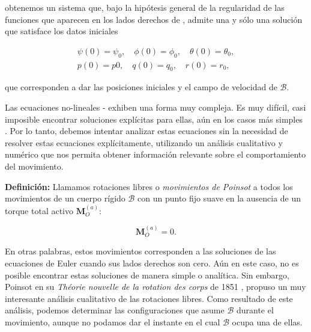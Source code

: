 \documentclass[a4paper,10pt]{article}
\numberwithin{equation}{section}
\newcommand{\definicion}{\textbf{Definición: }}
\begin{document}
obtenemos un sistema que, bajo la hipótesis general de la regularidad de las funciones 
que aparecen en los lados derechos de , admite 
una y sólo una solución que satisface los datos iniciales

\begin{align}
 \psi(0) = \psi_0, \quad \phi(0) = \phi_0, \quad \theta(0) = \theta_0, \\
 p(0) = p0, \quad q(0) = q_0, \quad r(0) = r_0, 
 \label{eq:poinsot13}
\end{align}

que corresponden a dar las posiciones iniciales y el campo de velocidad de $\mathcal{B}$.

\vspace{.3cm}

Las ecuaciones no-lineales - exhiben una forma muy compleja.
Es muy difícil, casi imposible encontrar soluciones explícitas para ellas, aún en los casos
más simples \cite{romano}. Por lo tanto, debemos intentar analizar estas ecuaciones sin 
la necesidad de resolver estas ecuaciones explícitamente, utilizando un análisis cualitativo
y numérico que nos permita obtener información relevante sobre el comportamiento del movimiento.

\vspace{.3cm}

\definicion Llamamos rotaciones libres o \emph{movimientos de Poinsot} a todos los movimientos 
de un cuerpo rígido $\mathcal{B}$ con un punto fijo suave en la ausencia de un torque 
total activo $\mathbf{M}_O^{(a)}$:

\begin{equation}
 \mathbf{M}_O^{(a)} = 0.
 \label{eq:poinsot14}
\end{equation}

En otras palabras, estos movimientos corresponden a las soluciones de las ecuaciones de 
Euler cuando sus lados derechos son cero. Aún en este caso, no es posible encontrar 
estas soluciones de manera simple o analítica. Sin embargo, Poinsot en su \emph{Théorie nouvelle de la
rotation des corps} de 1851 \cite{poinsot} , propuso  un muy interesante análisis cualitativo de las rotaciones libres. 
Como resultado de este  análisis, podemos determinar las configuraciones que asume $\mathcal{B}$ 
durante el movimiento, aunque no podamos dar el instante en el cual $\mathcal{B}$ ocupa una de ellas.

\vspace{.3cm}
\end{document}

